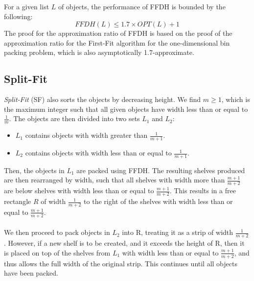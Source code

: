 \documentclass{article}
\begin{document}
For a given list $L$ of objects, the performance of FFDH is bounded by the following:
\[
	FFDH(L) \leq 1.7 \times OPT(L) + 1
\]
The proof for the approximation ratio of FFDH is based on the proof of the approximation ratio for the First-Fit algorithm for the one-dimensional bin packing problem, which is also asymptotically 1.7-approximate.
\subsection{Split-Fit}
\textit{Split-Fit} (SF) also sorts the objects by decreasing height. We find $m \geq 1$, which is the maximum integer such that all given objects have width less than or equal to $\frac{1}{m}$. The objects are then divided into two sets $L_1$ and $L_2$:
\begin{itemize}
\item $L_1$ contains objects with width greater than $\frac{1}{m+1}$.
\item $L_2$ contains objects with width less than or equal to $\frac{1}{m+1}$.
\end{itemize}
Then, the objects in $L_1$ are packed using FFDH. The resulting shelves produced are then rearranged by width, such that all shelves with width more than $\frac{m+1}{m+2}$ are below shelves with width less than or equal to $\frac{m+1}{m+2}$. This results in a free rectangle $R$ of width $\frac{1}{m+2}$ to the right of the shelves with width less than or equal to $\frac{m+1}{m+2}$.\\
\\
We then proceed to pack objects in $L_2$ into R, treating it as a strip of width $\frac{1}{m+2}$. However, if a new shelf is to be created, and it exceeds the height of R, then it is placed on top of the shelves from $L_1$ with width less than or equal to $\frac{m+1}{m+2}$, and thus allows the full width of the original strip. This continues until all objects have been packed.\\
\end{document}
